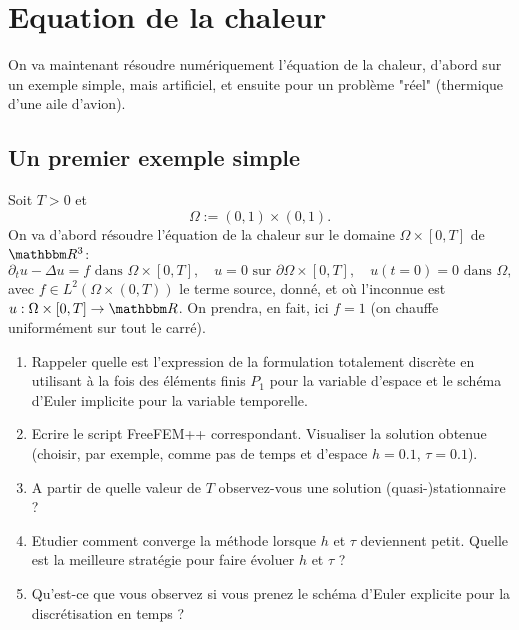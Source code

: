 



\newpage

\section{Equation de la chaleur}

On va maintenant résoudre numériquement l'équation de la chaleur, d'abord sur un exemple simple, mais artificiel, et ensuite pour un problème "réel" (thermique d'une aile d'avion).

\subsection{Un premier exemple simple}

Soit $T>0$ et \[
\Omega := (0,1) \times (0,1).
\]
On va d'abord résoudre l'équation de la chaleur sur le domaine $\Omega \times [0,T]$ de $\eR^3$:
\[
\partial_t u -\Delta u = f \textrm{ dans } \Omega \times [0,T],
\quad
u = 0 \textrm{ sur } \partial \Omega \times [0,T],
\quad
u(t=0) = 0 \textrm{ dans } \Omega,
\]
avec $f \in L^2(\Omega \times (0,T))$ le terme source, donné, et où l'inconnue est $u : \Omega \times [0,T] \rightarrow \eR$. On prendra, en fait, ici $f=1$ (on chauffe uniformément sur tout le carré).

\begin{enumerate}

\item Rappeler quelle est l'expression de la formulation totalement discrète en utilisant à la fois des éléments finis $P_1$ pour la variable d'espace et le schéma d'Euler implicite pour la variable temporelle. 

\item Ecrire le script FreeFEM++ correspondant. Visualiser la solution obtenue (choisir, par exemple, comme pas de temps et d'espace $h=0.1$, $\tau = 0.1$).

\item A partir de quelle valeur de $T$ observez-vous une solution (quasi-)stationnaire ?

\item Etudier comment converge la méthode lorsque $h$ et $\tau$ deviennent petit. Quelle est la meilleure stratégie pour faire évoluer $h$ et $\tau$ ?

\item Qu'est-ce que vous observez si vous prenez le schéma d'Euler explicite pour la discrétisation en temps ?

\end{enumerate}

